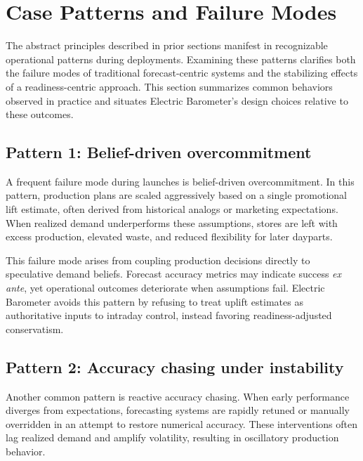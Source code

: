 
\section{Case Patterns and Failure Modes}
\label{sec:patterns}

The abstract principles described in prior sections manifest in recognizable operational patterns
during \LTO{} deployments. Examining these patterns clarifies both the failure modes of traditional
forecast-centric systems and the stabilizing effects of a readiness-centric approach. This section
summarizes common behaviors observed in practice and situates Electric Barometer’s design choices
relative to these outcomes.

\subsection{Pattern 1: Belief-driven overcommitment}
\label{subsec:belief-overcommitment}

A frequent failure mode during \LTO{} launches is belief-driven overcommitment. In this pattern,
production plans are scaled aggressively based on a single promotional lift estimate, often derived
from historical analogs or marketing expectations. When realized demand underperforms these
assumptions, stores are left with excess production, elevated waste, and reduced flexibility for
later dayparts.

This failure mode arises from coupling production decisions directly to speculative demand beliefs.
Forecast accuracy metrics may indicate success \emph{ex ante}, yet operational outcomes deteriorate
when assumptions fail. Electric Barometer avoids this pattern by refusing to treat uplift estimates as
authoritative inputs to intraday control, instead favoring readiness-adjusted conservatism.

\subsection{Pattern 2: Accuracy chasing under instability}
\label{subsec:accuracy-chasing}

Another common pattern is reactive accuracy chasing. When early \LTO{} performance diverges from
expectations, forecasting systems are rapidly retuned or manually overridden in an attempt to
restore numerical accuracy. These interventions often lag realized demand and amplify volatility,
resulting in oscillatory production behavior.

